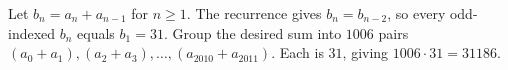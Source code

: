 Let $b_n=a_n+a_{n-1}$ for $n\ge1$. The recurrence gives $b_n=b_{n-2}$, so every odd-indexed $b_n$ equals $b_1=31$. Group the desired sum into $1006$ pairs $(a_0+a_1),(a_2+a_3),\ldots,(a_{2010}+a_{2011})$. Each is $31$, giving $1006\cdot31=\boxed{31186}$.
